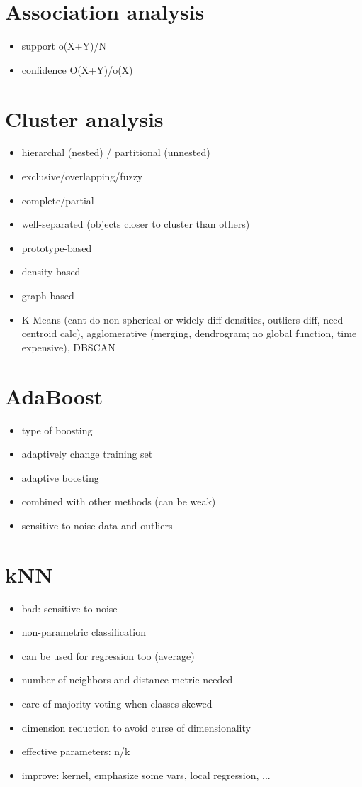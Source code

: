 \documentclass{article}
\begin{document}
\begin{multicols}{3}
\section{Association analysis}
\begin{itemize}
\item support o(X+Y)/N
\item confidence O(X+Y)/o(X)
\end{itemize}

\section{Cluster analysis}
\begin{itemize}
\item hierarchal (nested) / partitional (unnested)
\item exclusive/overlapping/fuzzy
\item complete/partial
\item well-separated (objects closer to cluster than others)
\item prototype-based
\item density-based
\item graph-based
\item K-Means (cant do non-spherical or widely diff densities, outliers diff, need centroid calc), agglomerative (merging, dendrogram; no global function, time expensive), DBSCAN
\end{itemize}

\section{AdaBoost}
\begin{itemize}
\item type of boosting
\item adaptively change training set
\item adaptive boosting
\item combined with other methods (can be weak)
\item sensitive to noise data and outliers
\end{itemize}

\section{kNN}
\begin{itemize}
\item bad: sensitive to noise
\item non-parametric classification
\item can be used for regression too (average)
\item number of neighbors and distance metric needed
\item care of majority voting when classes skewed
\item dimension reduction to avoid curse of dimensionality
\item effective parameters: n/k
\item improve: kernel, emphasize some vars, local regression, ...
\end{itemize}


\end{multicols}
\end{document}
